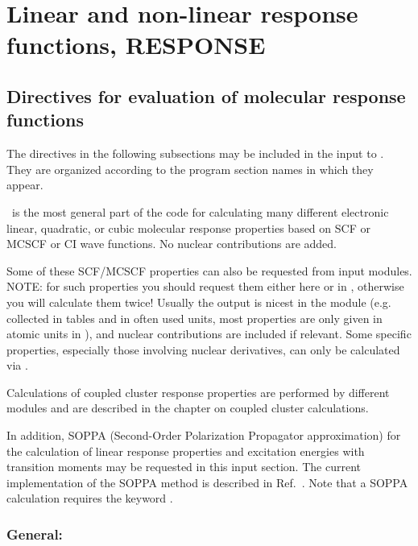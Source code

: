 \chapter{Linear and non-linear response functions, RESPONSE}
\label{ch:response}

\section{Directives for evaluation of molecular response functions}\label{sec:rspinp}

The directives in the following subsections may be included in the input to \resp.
They are organized according to the program section names in which they
appear.

\resp\ is the most general part of the code for calculating 
many different electronic linear, quadratic, or cubic molecular
response properties based on SCF or MCSCF or CI wave functions.
No nuclear contributions are added.

Some of these SCF/MCSCF properties can also be requested
from  input modules.
NOTE: for such properties you should request them either here or
in , otherwise you will calculate them twice!
Usually the output is nicest in
the  module (e.g. collected in tables and in
often used units, most properties are only given in atomic
units in \resp), and nuclear contributions are included if relevant.
Some specific properties, especially those involving nuclear derivatives,
can only be calculated via .

Calculations of coupled cluster response properties are performed
by different modules and are described
in the chapter on coupled cluster calculations.

In addition, SOPPA
(Second-Order Polarization Propagator 
approximation) for the calculation of linear response
properties and excitation energies with transition moments
may be requested in this input section. The current
implementation of the SOPPA method is described 
in Ref.~\cite{mjpekdtehjajjojcp}. Note that a SOPPA calculation
requires the keyword .


\subsection{General: }

